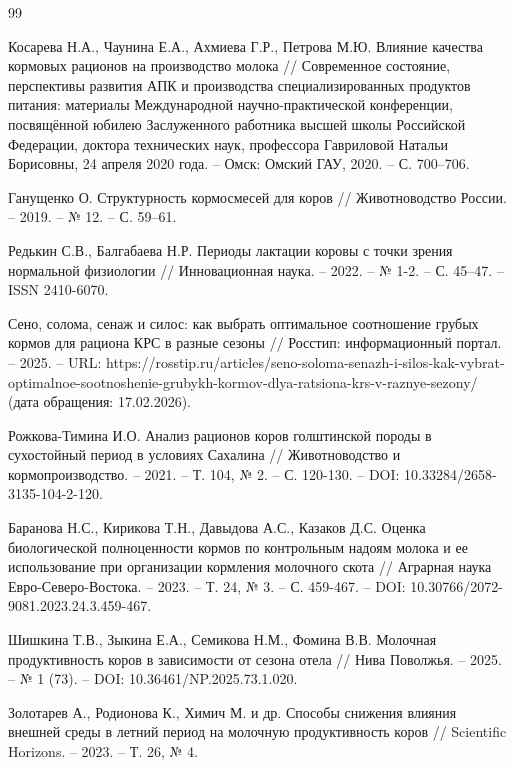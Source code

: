 

\begin{thebibliography}{99}

Косарева Н.А., Чаунина Е.А., Ахмиева Г.Р., Петрова М.Ю. 
Влияние качества кормовых рационов на производство молока // 
Современное состояние, перспективы развития АПК и производства специализированных продуктов питания: 
материалы Международной научно-практической конференции, посвящённой юбилею Заслуженного работника 
высшей школы Российской Федерации, доктора технических наук, профессора Гавриловой Натальи Борисовны, 
24 апреля 2020 года. – Омск: Омский ГАУ, 2020. – С. 700–706.

Ганущенко О. 
Структурность кормосмесей для коров // 
Животноводство России. – 2019. – № 12. – С. 59–61.

Редькин С.В., Балгабаева Н.Р. 
Периоды лактации коровы с точки зрения нормальной физиологии // 
Инновационная наука. – 2022. – № 1-2. – С. 45–47. – 
ISSN 2410-6070.

Сено, солома, сенаж и силос: как выбрать оптимальное соотношение грубых кормов для рациона КРС в разные сезоны //
Росстип: информационный портал. – 2025. – 
URL: https://rosstip.ru/articles/seno-soloma-senazh-i-silos-kak-vybrat-optimalnoe-sootnoshenie-grubykh-kormov-dlya-ratsiona-krs-v-raznye-sezony/ (дата обращения: 17.02.2026).

Рожкова-Тимина И.О.
Анализ рационов коров голштинской породы в сухостойный период в условиях Сахалина //
Животноводство и кормопроизводство. – 2021. – Т. 104, № 2. – С. 120-130. –
DOI: 10.33284/2658-3135-104-2-120.

Баранова Н.С., Кирикова Т.Н., Давыдова А.С., Казаков Д.С.
Оценка биологической полноценности кормов по контрольным надоям молока и ее использование при организации кормления молочного скота //
Аграрная наука Евро-Северо-Востока. – 2023. – Т. 24, № 3. – С. 459-467. –
DOI: 10.30766/2072-9081.2023.24.3.459-467.

Шишкина Т.В., Зыкина Е.А., Семикова Н.М., Фомина В.В.
Молочная продуктивность коров в зависимости от сезона отела //
Нива Поволжья. – 2025. – № 1 (73). – 
DOI: 10.36461/NP.2025.73.1.020.

Золотарев А., Родионова К., Химич М. и др.
Способы снижения влияния внешней среды в летний период на молочную продуктивность коров //
Scientific Horizons. – 2023. – Т. 26, № 4.


\end{thebibliography}
